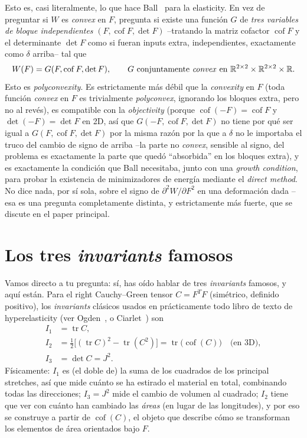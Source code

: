 \documentclass[11pt,a4paper]{article}
\newcommand{\Cof}{\operatorname{cof}}
\newcommand{\tr}{\operatorname{tr}}
\newcommand{\R}{\mathbb{R}}
\begin{document}
Esto es, casi literalmente, lo que hace Ball~\cite{Ball1977} para la
elasticity. En vez de preguntar si $W$ es \emph{convex} en $F$,
pregunta si existe una funci\'on $G$ de \emph{tres variables de bloque
independientes} $(F,\Cof F,\det F)$ --tratando la matriz cofactor
$\Cof F$ y el determinante $\det F$ como si fueran inputs extra,
independientes, exactamente como $\delta$ arriba-- tal que
\begin{equation}
 W(F)=G(F,\Cof F,\det F),\qquad G\text{ conjuntamente \emph{convex} en }
 \R^{2\times2}\times\R^{2\times2}\times\R.
 \label{eq:polyconvex-def}
\end{equation}
Esto es \emph{polyconvexity}. Es estrictamente m\'as d\'ebil que la
\emph{convexity} en $F$ (toda funci\'on \emph{convex} en $F$ es
trivialmente \emph{polyconvex}, ignorando los bloques extra, pero no al
rev\'es), es compatible con la \emph{objectivity} (porque
$\Cof(-F)=\Cof F$ y $\det(-F)=\det F$ en 2D, as\'i que
$G(-F,\Cof F,\det F)$ no tiene por qu\'e ser igual a
$G(F,\Cof F,\det F)$ por la misma raz\'on por la que a $\delta$ no le
importaba el truco del cambio de signo de arriba --la parte no
\emph{convex}, sensible al signo, del problema es exactamente la parte
que qued\'o ``absorbida'' en los bloques extra), y es exactamente la
condici\'on que Ball necesitaba, junto con una \emph{growth condition},
para probar la existencia de minimizadores de energ\'ia mediante el
\emph{direct method}. No dice nada, por s\'i sola, sobre el signo de
$\partial^2W/\partial F^2$ en una deformaci\'on dada --esa es una
pregunta completamente distinta, y estrictamente m\'as fuerte, que se
discute en el paper principal.

\section{Los tres \emph{invariants} famosos}
\label{sec:classical-invariants}

Vamos directo a tu pregunta: s\'i, has o\'ido hablar de tres
\emph{invariants} famosos, y aqu\'i est\'an. Para el right
Cauchy--Green tensor $C=F^TF$ (sim\'etrico, definido positivo), los
\emph{invariants} cl\'asicos usados en pr\'acticamente todo libro de
texto de hyperelasticity (ver Ogden~\cite{Ogden1984}, o
Ciarlet~\cite{Ciarlet1988}) son
\begin{align}
 I_1 &= \tr C, \label{eq:I1}\\
 I_2 &= \tfrac12\big[(\tr C)^2-\tr(C^2)\big]
       = \tr\!\big(\Cof(C)\big)\quad\text{(en 3D)}, \label{eq:I2}\\
 I_3 &= \det C = J^2. \label{eq:I3}
\end{align}
F\'isicamente: $I_1$ es (el doble de) la suma de los cuadrados de los
principal stretches, as\'i que mide cu\'anto se ha estirado el material
en total, combinando todas las direcciones; $I_3=J^2$ mide el cambio de
volumen al cuadrado; $I_2$ tiene que ver con cu\'anto han cambiado las
\emph{\'areas} (en lugar de las longitudes), y por eso se construye a
partir de $\Cof(C)$, el objeto que describe c\'omo se transforman los
elementos de \'area orientados bajo $F$.
\end{document}
